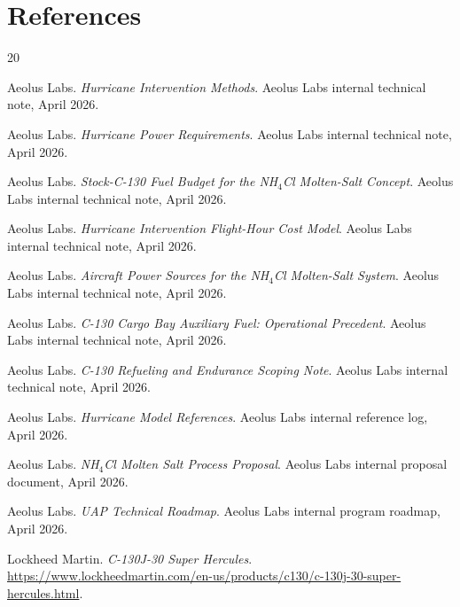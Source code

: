 \documentclass[8pt,twocolumn]{extarticle}
\begin{document}
\section*{References}
\begin{thebibliography}{20}

Aeolus Labs.
\newblock \emph{Hurricane Intervention Methods}.
\newblock Aeolus Labs internal technical note, April 2026.

Aeolus Labs.
\newblock \emph{Hurricane Power Requirements}.
\newblock Aeolus Labs internal technical note, April 2026.

Aeolus Labs.
\newblock \emph{Stock-C-130 Fuel Budget for the NH$_4$Cl Molten-Salt Concept}.
\newblock Aeolus Labs internal technical note, April 2026.

Aeolus Labs.
\newblock \emph{Hurricane Intervention Flight-Hour Cost Model}.
\newblock Aeolus Labs internal technical note, April 2026.

Aeolus Labs.
\newblock \emph{Aircraft Power Sources for the NH$_4$Cl Molten-Salt System}.
\newblock Aeolus Labs internal technical note, April 2026.

Aeolus Labs.
\newblock \emph{C-130 Cargo Bay Auxiliary Fuel: Operational Precedent}.
\newblock Aeolus Labs internal technical note, April 2026.

Aeolus Labs.
\newblock \emph{C-130 Refueling and Endurance Scoping Note}.
\newblock Aeolus Labs internal technical note, April 2026.

Aeolus Labs.
\newblock \emph{Hurricane Model References}.
\newblock Aeolus Labs internal reference log, April 2026.

Aeolus Labs.
\newblock \emph{NH$_4$Cl Molten Salt Process Proposal}.
\newblock Aeolus Labs internal proposal document, April 2026.

Aeolus Labs.
\newblock \emph{UAP Technical Roadmap}.
\newblock Aeolus Labs internal program roadmap, April 2026.

Lockheed Martin.
\newblock \emph{C-130J-30 Super Hercules}.
\newblock \url{https://www.lockheedmartin.com/en-us/products/c130/c-130j-30-super-hercules.html}.


\end{thebibliography}
\end{document}
